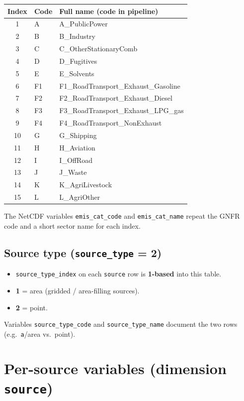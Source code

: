 \documentclass[11pt,a4paper]{article}
\begin{document}
\begin{center}
\small
\begin{tabular}{cll}
  \toprule
  Index & Code & Full name (code in pipeline) \\
  \midrule
  1 & A & A\_PublicPower \\
  2 & B & B\_Industry \\
  3 & C & C\_OtherStationaryComb \\
  4 & D & D\_Fugitives \\
  5 & E & E\_Solvents \\
  6 & F1 & F1\_RoadTransport\_Exhaust\_Gasoline \\
  7 & F2 & F2\_RoadTransport\_Exhaust\_Diesel \\
  8 & F3 & F3\_RoadTransport\_Exhaust\_LPG\_gas \\
  9 & F4 & F4\_RoadTransport\_NonExhaust \\
  10 & G & G\_Shipping \\
  11 & H & H\_Aviation \\
  12 & I & I\_OffRoad \\
  13 & J & J\_Waste \\
  14 & K & K\_AgriLivestock \\
  15 & L & L\_AgriOther \\
  \bottomrule
\end{tabular}
\end{center}

\noindent The NetCDF variables \texttt{emis\_cat\_code} and \texttt{emis\_cat\_name} repeat the GNFR code and a short sector name for each index.

\subsection{Source type (\texttt{source\_type} = 2)}

\begin{itemize}
  \item \texttt{source\_type\_index} on each \texttt{source} row is \textbf{1-based} into this table.
  \item \textbf{1} = area (gridded / area-filling sources).
  \item \textbf{2} = point.
\end{itemize}

\noindent Variables \texttt{source\_type\_code} and \texttt{source\_type\_name} document the two rows (e.g.\ \texttt{a}/area vs.\ point).

\section{Per-source variables (dimension \texttt{source})}
\end{document}
